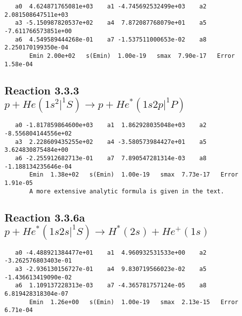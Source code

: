\documentclass[12pt]{article}
\begin{document}
\begin{small}\begin{verbatim}
   a0  4.624871765081e+03    a1 -4.745692532499e+03    a2  2.081508647511e+03
   a3 -5.150987820537e+02    a4  7.872087768079e+01    a5 -7.611766573851e+00
   a6  4.549589444268e-01    a7 -1.537511000653e-02    a8  2.250170199350e-04
       Emin 2.00e+02   s(Emin)  1.00e-19   smax  7.90e-17   Error 1.58e-04
\end{verbatim}\end{small}


\newpage
\subsection{
Reaction 3.3.3 $p + He(1s^2|^1S) \rightarrow p + He^*(1s2p|^1P)$}















\begin{small}\begin{verbatim}
   a0 -1.817859864600e+03    a1  1.862928035048e+03    a2 -8.556804144556e+02
   a3  2.228609435255e+02    a4 -3.580573984427e+01    a5  3.624830875484e+00
   a6 -2.255912682713e-01    a7  7.890547281314e-03    a8 -1.188134235646e-04
       Emin  1.38e+02   s(Emin)  1.00e-19   smax  7.73e-17   Error  1.91e-05
       A more extensive analytic formula is given in the text.
\end{verbatim}\end{small}

\newpage
\subsection{
Reaction 3.3.6a $   p + He^*(1s2s|^1S) \rightarrow H^*(2s) + He^+(1s)$}


\begin{small}\begin{verbatim}
   a0 -4.488921384477e+01    a1  4.960932531533e+00    a2 -3.262576803403e-01
   a3 -2.936130156727e-01    a4  9.830719566023e-02    a5 -1.436613419090e-02
   a6  1.109137228313e-03    a7 -4.365781757124e-05    a8  6.819428318304e-07
       Emin  1.26e+00   s(Emin)  1.00e-19   smax  2.13e-15   Error  6.71e-04
\end{verbatim}\end{small}
\end{document}
